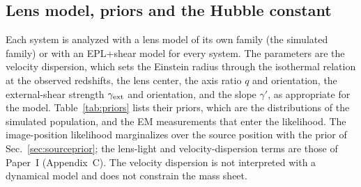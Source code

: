 \subsection{Lens model, priors and the Hubble constant}
\label{sec:lensmodel}
Each system is analyzed with a lens model of its own family (the simulated family) or with an EPL+shear model for every system. The parameters are the velocity dispersion, which sets the Einstein radius through the isothermal relation at the observed redshifts, the lens center, the axis ratio $q$ and orientation, the external-shear strength $\gamma_{\rm ext}$ and orientation, and the slope $\gamma'$, as appropriate for the model. Table~\ref{tab:priors} lists their priors, which are the distributions of the simulated population, and the EM measurements that enter the likelihood. The image-position likelihood marginalizes over the source position with the prior of Sec.~\ref{sec:sourceprior}; the lens-light and velocity-dispersion terms are those of Paper~I (Appendix~C). The velocity dispersion is not interpreted with a dynamical model and does not constrain the mass sheet.

